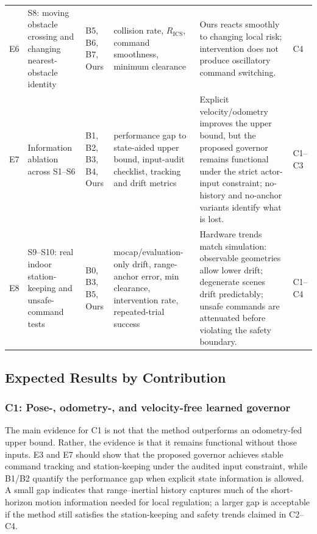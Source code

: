 \documentclass[11pt]{article}
\begin{document}
\begin{table}[p]
\begin{tabular}{L{0.07\textwidth}L{0.15\textwidth}L{0.15\textwidth}L{0.20\textwidth}L{0.28\textwidth}L{0.06\textwidth}}
E6 & S8: moving obstacle crossing and changing nearest-obstacle identity & B5, B6, B7, Ours & collision rate, $R_{\mathrm{ICS}}$, command smoothness, minimum clearance & Ours reacts smoothly to changing local risk; intervention does not produce oscillatory command switching. & C4 \\
E7 & Information ablation across S1--S6 & B1, B2, B3, B4, Ours & performance gap to state-aided upper bound, input-audit checklist, tracking and drift metrics & Explicit velocity/odometry improves the upper bound, but the proposed governor remains functional under the strict actor-input constraint; no-history and no-anchor variants identify what is lost. & C1--C3 \\
E8 & S9--S10: real indoor station-keeping and unsafe-command tests & B0, B3, B5, Ours & mocap/evaluation-only drift, range-anchor error, min clearance, intervention rate, repeated-trial success & Hardware trends match simulation: observable geometries allow lower drift; degenerate scenes drift predictably; unsafe commands are attenuated before violating the safety boundary. & C1--C4 \\
\bottomrule
\end{tabular}
\end{table}

\subsection{Expected Results by Contribution}
\label{sec:exp_expected_by_contribution}

\subsubsection{C1: Pose-, odometry-, and velocity-free learned governor}
The main evidence for C1 is not that the method outperforms an odometry-fed
upper bound.  Rather, the evidence is that it remains functional without those
inputs.  E3 and E7 should show that the proposed governor achieves stable
command tracking and station-keeping under the audited input constraint, while
B1/B2 quantify the performance gap when explicit state information is allowed.
A small gap indicates that range--inertial history captures much of the
short-horizon motion information needed for local regulation; a larger gap is
acceptable if the method still satisfies the station-keeping and safety trends
claimed in C2--C4.
\end{document}
